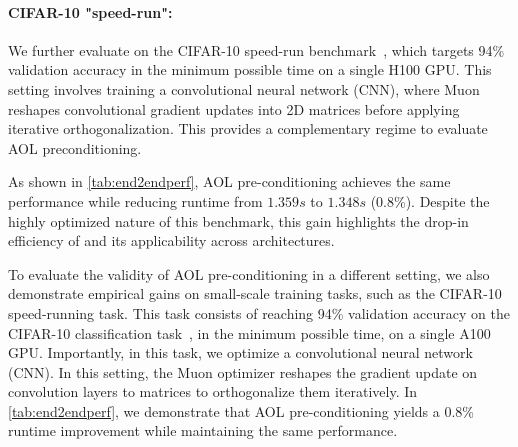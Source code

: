 \paragraph{CIFAR-10 "speed-run":}%

We further evaluate \turbomuon on the CIFAR-10 speed-run benchmark~\cite{Jordan2024cifar10airbench}, which targets 94\% validation accuracy in the minimum possible time on a single H100 GPU. This setting involves training a convolutional neural network (CNN), where Muon 
reshapes convolutional gradient updates into 2D matrices before applying iterative orthogonalization.
This provides a complementary regime to evaluate AOL preconditioning.

As shown in \cref{tab:end2endperf}, AOL pre-conditioning achieves the same performance while reducing runtime from $1.359s$ to $1.348s$ (0.8\%). Despite the highly optimized nature of this benchmark, this gain highlights the drop-in efficiency of \turbomuon and its applicability across architectures.

\iffalse
To evaluate the validity of AOL pre-conditioning in a different setting, we also demonstrate empirical gains on small-scale training tasks, such as the CIFAR-10 speed-running task\cite{Jordan2024cifar10airbench}. This task consists of reaching 94\% validation accuracy on the CIFAR-10 classification task~\cite{krizhevsky2009learning}, in the minimum possible time, on a single A100 GPU. Importantly, in this task, we optimize a convolutional neural network (CNN). In this setting, the Muon optimizer reshapes the gradient update on convolution layers to matrices to orthogonalize them iteratively. In %
\cref{tab:end2endperf},
we demonstrate that AOL pre-conditioning yields a 0.8\% runtime improvement while maintaining the same performance.%
%
%

